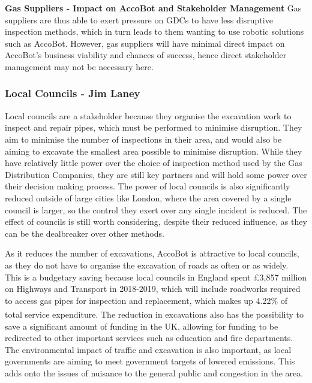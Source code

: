 \documentclass[11pt]{article}		%
\newcommand{\supercite}[1]{\textsuperscript{\cite{#1}}}		%
\begin{document}
		\textbf{Gas Suppliers - Impact on AccoBot and Stakeholder Management}
		Gas suppliers are thus able to exert pressure on GDCs to have less disruptive inspection methods, which in turn leads to them wanting to use robotic solutions such as AccoBot. However, gas suppliers will have minimal direct impact on AccoBot’s business viability and chances of success, hence direct stakeholder management may not be necessary here. 
		
		\subsubsection[Local Councils]{Local Councils - Jim Laney}
			
			Local councils are a stakeholder because they organise the excavation work to inspect and repair pipes, which must be performed to minimise disruption.
			They aim to minimise the number of inspections in their area, and would also be aiming to excavate the smallest area possible to minimise disruption.
			While they have relatively little power over the choice of inspection method used by the Gas Distribution Companies, they are still key partners and will hold some power over their decision making process.
			The power of local councils is also significantly reduced outside of large cities like London, where the area covered by a single council is larger, so the control they exert over any single incident is reduced.
			The effect of councils is still worth considering, despite their reduced influence, as they can be the dealbreaker over other methods.
			
			As it reduces the number of excavations, AccoBot is attractive to local councils, as they do not have to organise the excavation of roads as often or as widely.
			This is a budgetary saving because local councils in England spent £3,857 million on Highways and Transport in 2018-2019, which will include roadworks required to access gas pipes for inspection and replacement, which makes up 4.22\% of total service expenditure\supercite{ministry2020local}.
			The reduction in excavations also has the possibility to save a significant amount of funding in the UK, allowing for funding to be redirected to other important services such as education and fire departments.
			The environmental impact of traffic and excavation is also important, as local governments are aiming to meet government targets of lowered emissions.
			This adds onto the issues of nuisance to the general public and congestion in the area.
		
\end{document}
